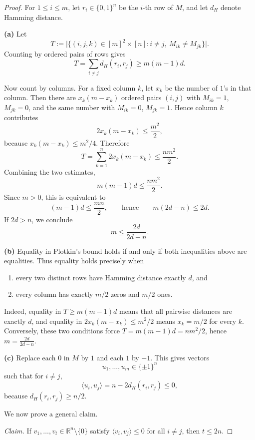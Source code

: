 \documentclass[11pt, a4paper]{ctexrep}
\begin{document}
\begin{proof}
    For \(1\le i\le m\), let \(r_i\in\{0,1\}^n\) be the \(i\)-th row of \(M\), and let \(d_H\) denote
    Hamming distance.

    \noindent\textbf{(a)}
    Let
    \[
        T:=\bigl|\{(i,j,k)\in [m]^2\times [n]:i\ne j,\ M_{ik}\ne M_{jk}\}\bigr|.
    \]
    Counting by ordered pairs of rows gives
    \[
        T=\sum_{i\ne j} d_H(r_i,r_j)\ge m(m-1)d.
    \]

    Now count by columns. For a fixed column \(k\), let \(x_k\) be the number of \(1\)'s in that column.
    Then there are \(x_k(m-x_k)\) ordered pairs \((i,j)\) with \(M_{ik}=1\), \(M_{jk}=0\), and the same
    number with \(M_{ik}=0\), \(M_{jk}=1\). Hence column \(k\) contributes
    \[
        2x_k(m-x_k)\le \frac{m^2}{2},
    \]
    because \(x_k(m-x_k)\le m^2/4\). Therefore
    \[
        T=\sum_{k=1}^{n}2x_k(m-x_k)\le \frac{nm^2}{2}.
    \]
    Combining the two estimates,
    \[
        m(m-1)d\le \frac{nm^2}{2}.
    \]
    Since \(m>0\), this is equivalent to
    \[
        (m-1)d\le \frac{mn}{2},
        \qquad\text{hence}\qquad
        m(2d-n)\le 2d.
    \]
    If \(2d>n\), we conclude
    \[
        m\le \frac{2d}{2d-n}.
    \]

    \noindent\textbf{(b)}
    Equality in Plotkin's bound holds if and only if both inequalities above are equalities.
    Thus equality holds precisely when
    \begin{enumerate}
        \item every two distinct rows have Hamming distance exactly \(d\), and
        \item every column has exactly \(m/2\) zeros and \(m/2\) ones.
    \end{enumerate}
    Indeed, equality in \(T\ge m(m-1)d\) means that all pairwise distances are exactly \(d\), and equality in
    \(2x_k(m-x_k)\le m^2/2\) means \(x_k=m/2\) for every \(k\). Conversely, these two conditions force
    \(T=m(m-1)d=nm^2/2\), hence \(m=\frac{2d}{2d-n}\).

    \noindent\textbf{(c)}
    Replace each \(0\) in \(M\) by \(1\) and each \(1\) by \(-1\). This gives vectors
    \[
        u_1,\dots,u_m\in \{\pm1\}^n
    \]
    such that for \(i\ne j\),
    \[
        \langle u_i,u_j\rangle = n-2d_H(r_i,r_j)\le 0,
    \]
    because \(d_H(r_i,r_j)\ge n/2\).

    We now prove a general claim.

    \medskip
    \noindent\emph{Claim.} If \(v_1,\dots,v_t\in \mathbb{R}^n\setminus\{0\}\) satisfy
    \(\langle v_i,v_j\rangle\le 0\) for all \(i\ne j\), then \(t\le 2n\).


\end{proof}
\end{document}
